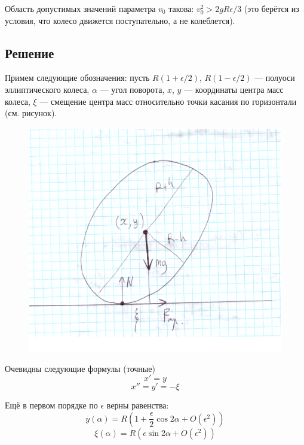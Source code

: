 \documentclass{article}
\begin{document}
	Область допустимых значений параметра $v_0$ такова: $v_0^2 > 2gR\epsilon/3$ (это берётся из
	условия, что колесо движется поступательно, а не колеблется).
	\subsection{Решение}
	Примем следующие обозначения: пусть $R(1 + \epsilon/2)$, 
	$R(1 - \epsilon/2)$ --- полуоси эллиптического колеса,
	$\alpha$ --- угол поворота, $x$, $y$ --- координаты центра масс колеса, $\xi$ --- смещение
	центра масс относительно точки касания по горизонтали (см. рисунок). 
	\begin{figure}[h]
		\includegraphics[width=\linewidth]{ellipsis.png}
	\end{figure}
	
	Очевидны следующие формулы (точные)
	\begin{equation}
		\label{eq1}
		x' = y
	\end{equation}
	\begin{equation}
		\label{eq2}
		x'' = y' = -\xi
	\end{equation}

	Ещё в первом порядке по $\epsilon$ верны равенства:	
	\begin{equation}
		\label{rad}
		y(\alpha) = R\left(1 + \frac{\epsilon}{2} \cos{2\alpha} + O(\epsilon^2) \right )
	\end{equation}
	\begin{equation}
		\label{xi}
		\xi(\alpha) = R\left(\epsilon\sin{2\alpha} + O(\epsilon^2)\right)
	\end{equation}
\end{document}
